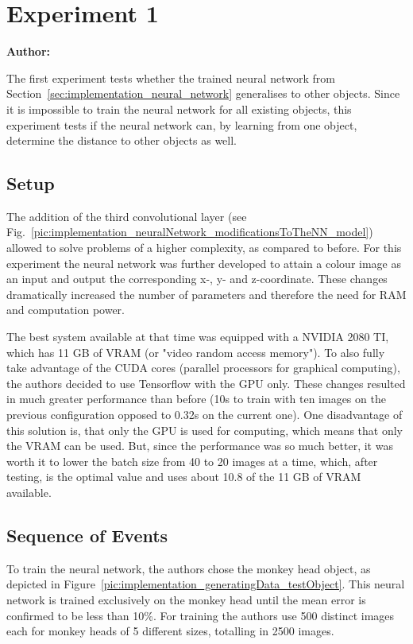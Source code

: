 \chapter{Experiment 1}
\label{cap:experiment1}

\textbf{Author: } 

The first experiment tests whether the trained neural network from Section~\ref{sec:implementation_neural_network} generalises to other objects. Since it is impossible to train the neural network for all existing objects, this experiment tests if the neural network can, by learning from one object, determine the distance to other objects as well.

\section{Setup}
The addition of the third convolutional layer (see Fig.~\ref{pic:implementation_neuralNetwork_modificationsToTheNN_model}) allowed to solve problems of a higher complexity, as compared to before. For this experiment the neural network was further developed to attain a colour image as an input and output the corresponding x-, y- and z-coordinate. These changes dramatically increased the number of parameters and therefore the need for RAM and computation power. 

The best system available at that time was equipped with a NVIDIA 2080 TI, which has 11 GB of VRAM (or "video random access memory"). To also fully take advantage of the CUDA cores (parallel processors for graphical computing), the authors decided to use Tensorflow with the GPU only. These changes resulted in much greater performance than before (10s to train with ten images on the previous configuration opposed to 0.32s on the current one). One disadvantage of this solution is, that only the GPU is used for computing, which means that only the VRAM can be used. But, since the performance was so much better, it was worth it to lower the batch size from 40 to 20 images at a time, which, after testing, is the optimal value and uses about 10.8 of the 11 GB of VRAM available.

\section{Sequence of Events}
To train the neural network, the authors chose the monkey head object, as depicted in Figure~\ref{pic:implementation_generatingData_testObject}. This neural network is trained exclusively on the monkey head until the mean error is confirmed to be less than 10\%. For training the authors use 500 distinct images each for monkey heads of 5 different sizes, totalling in 2500 images.

